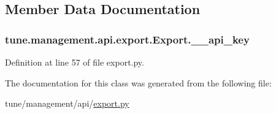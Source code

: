 \subsection{Member Data Documentation}
\hypertarget{classtune_1_1management_1_1api_1_1export_1_1Export_ad9a517a5da2e72b2c26695151909ffe2}{
\subsubsection[{\-\_\-\-\_\-api\-\_\-key}]{\setlength{\rightskip}{0pt plus 5cm}tune.\-management.\-api.\-export.\-Export.\-\_\-\-\_\-api\-\_\-key\hspace{0.3cm}{\ttfamily [private]}}}\label{classtune_1_1management_1_1api_1_1export_1_1Export_ad9a517a5da2e72b2c26695151909ffe2}


Definition at line 57 of file export.\-py.



The documentation for this class was generated from the following file\-:\begin{DoxyCompactItemize}
\item 
tune/management/api/\hyperlink{export_8py}{export.\-py}\end{DoxyCompactItemize}
